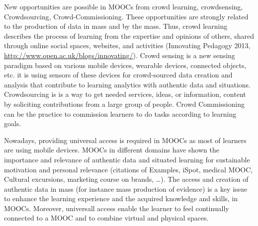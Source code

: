 New opportunities are
possible in MOOCs from crowd learning, crowdsensing, Crowdsourcing,
Crowd-Commissioning. These opportunities are strongly related to the
production of data in mass and by the mass. Thus, crowd learning
describes the process of learning from the expertise and opinions of
others, shared through online social spaces, websites, and activities
(Innovating Pedagogy 2013,
\url{http://www.open.ac.uk/blogs/innovating/}). Crowd sensing is a new sensing
paradigm based on various mobile devices, wearable devices, connected
objects, etc. it is using sensors of these devices for crowd-sourced
data creation and analysis that contribute to learning analytics with
authentic data and situations. Crowdsourcing is is a way to get needed
services, ideas, or information, content by soliciting contributions
from a large group of people. Crowd Commissioning can be the practice to
commission learners to do tasks according to learning goals.  

Nowadays,
providing universal access is required in MOOCs as most of learners are
using mobile devices. MOOCs in different domains have shown the
importance and relevance of authentic data and situated learning for
sustainable motivation and personal relevance (citations of Examples,
iSpot, medical MOOC, Cultural excursions, marketing course on brands,
\ldots). The access and creation of authentic data in mass (for instance mass
production of evidence) is a key issue to enhance the learning
experience and the acquired knowledge and skills, in MOOCs. Moreover,
universall access enable the learner to feel continually connected to a
MOOC and to combine virtual and physical spaces.
